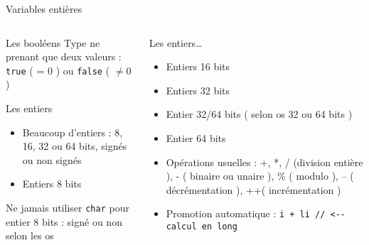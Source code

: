 \documentclass[handout,10pt]{beamer}
\newcommand{\includepartcode}[4][cpp]{

}
\begin{document}
\begin{frame}[fragile]{Variables entières}
 \tiny
 \begin{columns}
  
 \begin{column}{0.5\textwidth}
 \begin{block}{Les booléens}
  Type ne prenant que deux valeurs : \lstinline$true$ ( = 0 ) ou \lstinline$false$ ( $\neq 0$ )
  \includepartcode{declarations.cpp}{12}{21}
 \end{block}
 \begin{block}{Les entiers}
 \begin{itemize}
  \item Beaucoup d'entiers : 8, 16, 32 ou 64 bits, signés ou non signés
  \item Entiers 8 bits
 \includepartcode{declarations.cpp}{25}{26}
 \includepartcode{declarations.cpp}{28}{29}
 \end{itemize}
 \alert{Ne jamais utiliser \lstinline$char$ pour entier 8 bits : signé ou non selon les os}
 \end{block}
 \end{column}
 
 \begin{column}{0.5\textwidth}
 \begin{block}{Les entiers\ldots}
 \begin{itemize}
  \item Entiers 16 bits
 \includepartcode{declarations.cpp}{32}{33}
 \includepartcode{declarations.cpp}{35}{36}
 \item Entiers 32 bits
 \includepartcode{declarations.cpp}{38}{39}
 \item Entier 32/64 bits ( selon os 32 ou 64 bits )
 \includepartcode{declarations.cpp}{40}{41}
 \item Entier 64 bits
 \includepartcode{declarations.cpp}{42}{43}
 \item Opérations usuelles : +, *, / (division entière ), - ( binaire ou unaire ), \% ( modulo ), -- ( décrémentation ), ++( incrémentation )
 \item Promotion automatique : \lstinline$i + li // <-- calcul en long$
 \end{itemize}
 \end{block}
 \end{column}
 \end{columns}
\end{frame}
\end{document}
